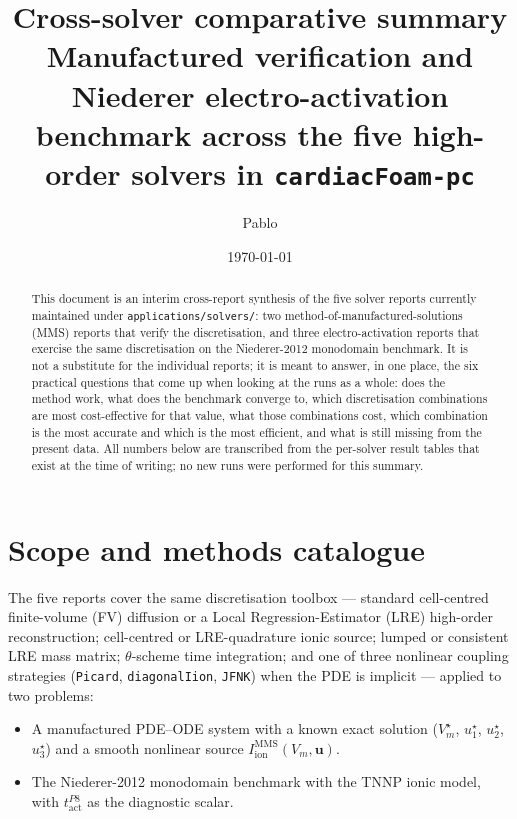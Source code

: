 \documentclass[11pt,a4paper]{article}
\title{Cross-solver comparative summary\\
       \large Manufactured verification and Niederer electro-activation
       benchmark across the five high-order solvers
       in \texttt{cardiacFoam-pc}}
\author{Pablo}
\date{\today}
\newcommand{\Vm}{V_{m}}
\newcommand{\Iion}{I_{\text{ion}}}
\newcommand{\tact}{t_{\text{act}}^{P8}}
\newcommand{\code}[1]{\texttt{\small #1}}
\begin{document}
\maketitle

\begin{abstract}
This document is an interim cross-report synthesis of the five solver
reports currently maintained under
\code{applications/solvers/}: two method-of-manufactured-solutions
(MMS) reports that verify the discretisation, and three
electro-activation reports that exercise the same discretisation on
the Niederer-2012 monodomain benchmark. It is not a substitute for the
individual reports; it is meant to answer, in one place, the six
practical questions that come up when looking at the runs as a whole:
does the method work, what does the benchmark converge to, which
discretisation combinations are most cost-effective for that value,
what those combinations cost, which combination is the most accurate
and which is the most efficient, and what is still missing from the
present data. All numbers below are transcribed from the per-solver
result tables that exist at the time of writing; no new runs were
performed for this summary.
\end{abstract}

\tableofcontents
\bigskip

\section{Scope and methods catalogue}
\label{sec:scope}

The five reports cover the same discretisation toolbox --- standard
cell-centred finite-volume (FV) diffusion or a Local
Regression-Estimator (LRE) high-order reconstruction; cell-centred or
LRE-quadrature ionic source; lumped or consistent LRE mass matrix;
$\theta$-scheme time integration; and one of three nonlinear coupling
strategies (\code{Picard}, \code{diagonalIion}, \code{JFNK}) when the
PDE is implicit --- applied to two problems:

\begin{itemize}[leftmargin=*]
\item A manufactured PDE--ODE system with a known exact solution
($\Vm^\star$, $u_1^\star$, $u_2^\star$, $u_3^\star$) and a smooth
nonlinear source $\Iion^{\text{MMS}}(\Vm,\mathbf{u})$.
\item The Niederer-2012 monodomain benchmark with the TNNP ionic
model, with $\tact$ as the diagnostic scalar.
\end{itemize}
\end{document}
